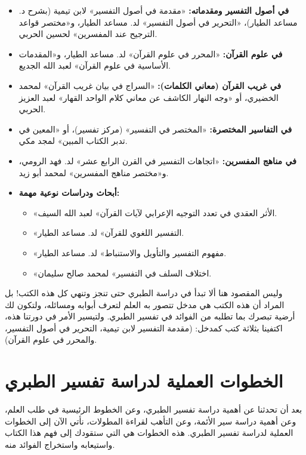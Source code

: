 \begin{itemize}
    \item \textbf{في أصول التفسير ومقدماته:} «مقدمة في أصول التفسير» لابن تيمية (بشرح د. مساعد الطيار)، «التحرير في أصول التفسير» لد. مساعد الطيار، و«مختصر قواعد الترجيح عند المفسرين» لحسين الحربي.
    \item \textbf{في علوم القرآن:} «المحرر في علوم القرآن» لد. مساعد الطيار، و«المقدمات الأساسية في علوم القرآن» لعبد الله الجديع.
    \item \textbf{في غريب القرآن (معاني الكلمات):} «السراج في بيان غريب القرآن» لمحمد الخضيري، أو «وجه النهار الكاشف عن معاني كلام الواحد القهار» لعبد العزيز الحربي.
    \item \textbf{في التفاسير المختصرة:} «المختصر في التفسير» (مركز تفسير)، أو «المعين في تدبر الكتاب المبين» لمجد مكي.
    \item \textbf{في مناهج المفسرين:} «اتجاهات التفسير في القرن الرابع عشر» لد. فهد الرومي، و«مختصر مناهج المفسرين» لمحمد أبو زيد.
    \item \textbf{أبحاث ودراسات نوعية مهمة:}
    \begin{itemize}
        \item «الأثر العقدي في تعدد التوجيه الإعرابي لآيات القرآن» لعبد الله السيف.
        \item «التفسير اللغوي للقرآن» لد. مساعد الطيار.
        \item «مفهوم التفسير والتأويل والاستنباط» لد. مساعد الطيار.
        \item «اختلاف السلف في التفسير» لمحمد صالح سليمان.
    \end{itemize}
\end{itemize}

وليس المقصود هنا ألا تبدأ في دراسة الطبري حتى تنجز وتنهي كل هذه الكتب! بل المراد أن هذه الكتب هي مدخل تتصور به العلم لتعرف أبوابه ومسائله، ولتكون لك أرضية تبصرك بما تطلبه من الفوائد في تفسير الطبري. ولتيسير الأمر في دورتنا هذه، اكتفينا بثلاثة كتب كمدخل: (مقدمة التفسير لابن تيمية، التحرير في أصول التفسير، والمحرر في علوم القرآن).

\separator

\section*{الخطوات العملية لدراسة تفسير الطبري}
بعد أن تحدثنا عن أهمية دراسة تفسير الطبري، وعن الخطوط الرئيسية في طلب العلم، وعن أهمية دراسة سير الأئمة، وعن التأهب لقراءة المطولات، نأتي الآن إلى الخطوات العملية لدراسة تفسير الطبري. هذه الخطوات هي التي ستقودك إلى فهم هذا الكتاب واستيعابه واستخراج الفوائد منه.

